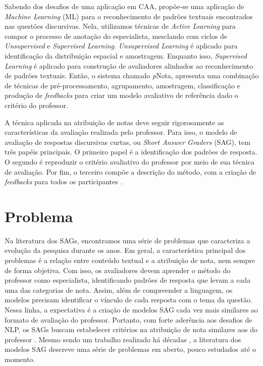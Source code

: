 Sabendo dos desafios de uma aplicação em CAA, propõe-se uma aplicação de \textit{Machine Learning} (ML) para o reconhecimento de padrões textuais encontrados nas questões discursivas. Nela, utilizamos técnicas de \textit{Active Learning} para compor o processo de anotação do especialista, mesclando com ciclos de \textit{Unsupervised} e \textit{Supervised Learning}. \textit{Unsupervised Learning} é aplicado para identificação da distribuição espacial e amostragem. Enquanto isso, \textit{Supervised Learning} é aplicado para construção de avaliadores alinhados ao reconhecimento de padrões textuais. Então, o sistema chamado \textit{p}Nota, apresenta uma combinação de técnicas de pré-processamento, agrupamento, amostragem, classificação e produção de \textit{feedbacks} para criar um modelo avaliativo de referência dado o critério do professor.

A técnica aplicada na atribuição de notas deve seguir rigorosamente as características da avaliação realizada pelo professor. Para isso, o modelo de avaliação de respostas discursivas curtas, ou \textit{Short Answer Graders} (SAG), tem três papéis principais. O primeiro papel é a identificação dos padrões de resposta. O segundo é reproduzir o critério avaliativo do professor por meio de sua técnica de avaliação. Por fim, o terceiro compõe a descrição do método, com a criação de \textit{feedbacks} para todos os participantes \cite{arter2006, spalenza2016a}.


\section{Problema} 
\label{cap1-problema}

Na literatura dos SAGs, encontramos uma série de problemas que caracteriza a evolução da pesquisa durante os anos. Em geral, a característica principal dos problemas é a relação entre conteúdo textual e a atribuição de nota, nem sempre de forma objetiva. Com isso, os avaliadores devem aprender o método do professor como especialista, identificando padrões de resposta que levam a cada uma das categorias de nota. Assim, além de compreender a linguagem, os modelos precisam identificar o vínculo de cada resposta com o tema da questão. Nessa linha, a expectativa é a criação de modelos SAG cada vez mais similares ao formato de avaliação do professor. Portanto, com forte aderência aos desafios de NLP, os SAGs buscam estabelecer critérios na atribuição de nota similares aos do professor \cite{pado2021}. Mesmo sendo um trabalho realizado há décadas \cite{burrows2015}, a literatura dos modelos SAG descreve uma série de problemas em aberto, pouco estudados até o momento.

